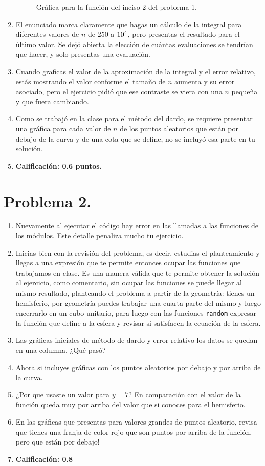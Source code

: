 \begin{enumerate}
\begin{figure}[H]
    \caption{Gráfica para la función del inciso 2 del problema 1.}
\end{figure}
\item El enunciado marca claramente que hagas un cálculo de la integral para diferentes valores de $n$ de $250$ a $\num{d4}$, pero presentas el resultado para el último valor. Se dejó abierta la elección de cuántas evaluaciones se tendrían que hacer, y solo presentas una evaluación.
\item Cuando graficas el valor de la aproximación de la integral y el error relativo, estás mostrando el valor conforme el tamaño de $n$ aumenta y su error asociado, pero el ejercicio pidió que ese contraste se viera con una $n$ pequeña y que fuera cambiando.
\item Como se trabajó en la clase para el método del dardo, se requiere presentar una gráfica para cada valor de $n$ de los puntos aleatorios que están por debajo de la curva y de una cota que se define, no se incluyó esa parte en tu solución.
\item \textbf{Calificación: 0.6 puntos.}
\end{enumerate}

\section{Problema 2.}

\begin{enumerate}
\item Nuevamente al ejecutar el código hay error en las llamadas a las funciones de los módulos. Este detalle penaliza mucho tu ejercicio.
\item Inicias bien con la revisión del problema, es decir, estudias el planteamiento y llegas a una expresión que te permite entonces ocupar las funciones que trabajamos en clase. Es una manera válida que te permite obtener la solución al ejercicio, como comentario, sin ocupar las funciones se puede llegar al mismo resultado, planteando el problema a partir de la geometría: tienes un hemisferio, por geometría puedes trabajar una cuarta parte del mismo y luego encerrarlo en un cubo unitario, para luego con las funciones \texttt{random} expresar la función que define a la esfera y revisar si satisfacen la ecuación de la esfera.
\item Las gráficas iniciales de método de dardo y error relativo los datos se quedan en una columna. ¿Qué pasó?
\item Ahora si incluyes gráficas con los puntos aleatorios por debajo y por arriba de la curva.
\item ¿Por que usaste un valor para $y = 7$? En comparación con el valor de la función queda muy por arriba del valor que si conoces para el hemisferio.
\item En las gráficas que presentas para valores grandes de puntos aleatorio, revisa que tienes una franja de color rojo que son puntos por arriba de la función, pero que están por debajo! 
\item \textbf{Calificación: 0.8}
\end{enumerate}


